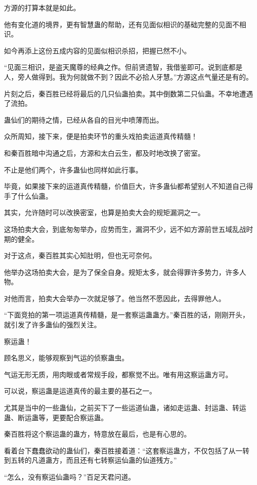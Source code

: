 \begin{this_body}
方源的打算本就是如此。

他有变化道的境界，更有智慧蛊的帮助，还有见面似相识的基础完整的见面不相识。

如今再添上这份五成内容的见面似相识杀招，把握已然不小。

“见面三相识，是盗天魔尊的经典之作。但前贤遗智，我借鉴即可。说到底都是人，旁人做得到。我为何就做不到？因此不必拾人牙慧。”方源这点气量还是有的。

片刻之后，秦百胜已经将最后的几只仙蛊拍卖。其中倒数第二只仙蛊。不幸地遭遇了流拍。

蛊仙们的期待之情，已经从各自的目光中喷薄而出。

众所周知，接下来，便是拍卖环节的重头戏拍卖运道真传精髓！

和秦百胜暗中沟通之后，方源和太白云生，都及时地改换了密室。

不止是他们两个，许多蛊仙也同样如此行事。

毕竟，如果接下来的运道真传精髓，价值巨大，许多蛊仙都希望别人不知道自己得手了什么仙蛊。

其实，允许随时可以改换密室，也算是拍卖大会的规矩漏洞之一。

这场拍卖大会，到底匆匆举办，应势而生，漏洞不少，远不如方源前世五域乱战时期的健全。

对于这点，秦百胜其实心知肚明，但也无可奈何。

他举办这场拍卖大会，是为了保全自身。规矩太多，就会得罪许多势力，许多人物。

对他而言，拍卖大会举办一次就足够了。他当然不愿因此，去得罪他人。

“下面竞拍的第一项运道真传精髓，是一套察运蛊蛊方。”秦百胜的话，刚刚开头，就引发了许多蛊仙的强烈关注。

察运蛊！

顾名思义，能够观察到气运的侦察蛊虫。

气运无形无质，用肉眼或者常规手段，都察觉不出。唯有用这察运蛊方可。

可以说，察运蛊是运道真传的最主要的基石之一。

尤其是当中的一些蛊仙，之前买下了一些运道仙蛊，诸如走运蛊、封运蛊、转运蛊、断运蛊等，更要配合察运蛊。

秦百胜将这个察运蛊的蛊方，特意放在最后，也是有心思的。

看着台下蠢蠢欲动的蛊仙们，秦百胜接着道：“这套察运蛊方，不仅包括了从一转到五转的凡道蛊方，而且还有七转察运仙蛊的仙道残方。”

“怎么，没有察运仙蛊吗？”百足天君问道。


\end{this_body}
